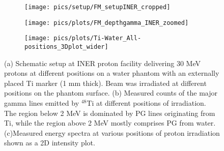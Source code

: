 \documentclass[11pt,a4paper]{article}
\begin{document}
\begin{figure}[h] 
\centering
	\begin{subfigure}[b]{0.39\textwidth} %
	\centering
    \texttt{[image: pics/setup/FM\_setupINER\_cropped]}
	\caption{}
	\end{subfigure}
	\hfill
    \hspace{0.00\textwidth} %
	\begin{subfigure}[b]{0.59\textwidth} %
	\centering
	\texttt{[image: pics/plots/FM\_depthgamma\_INER\_zoomed]}
	\caption{}
	\end{subfigure}
	\hfill
	\begin{subfigure}[b]{0.99\textwidth} %
	\centering
	\texttt{[image: pics/plots/Ti-Water\_All-positions\_3Dplot\_wider]}
	\caption{}
	\end{subfigure} 
	\hfill
\caption{(a) Schematic setup at INER proton facility delivering 30 MeV protons at different positions on a water phantom with an externally placed Ti  marker (1 mm thick). Beam was irradiated at different positions on the phantom surface. (b) Measured counts of the major gamma lines emitted by $\mathrm{^{48}Ti}$ at different positions of irradiation.  The region below 2 MeV is dominated by PG lines originating from Ti, while the region above 2 MeV mostly comprises PG from water. (c)Measured energy spectra at various positions of proton irradiation shown as a 2D intensity plot. }
\label{fig_FM_INER}
\end{figure}

\end{document}
